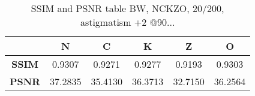 
\begin{table}[h]
	\centering
	\label{table:metrics_astig+2@90_bw}
	\caption[???]{SSIM and PSNR table BW, NCKZO, 20/200, astigmatism +2 @90...}

	\begin{tabular}{cccccc}
	{\bf }                          & {\bf N} & {\bf C} & {\bf K} & {\bf Z} & {\bf O} \\ \hline
	\multicolumn{1}{c|}{{\bf SSIM}} & 0.9307  & 0.9271  & 0.9277  & 0.9193  & 0.9303  		\\
	\multicolumn{1}{c|}{{\bf PSNR}} & 37.2835 & 35.4130 & 36.3713 & 32.7150 & 36.2564
	\end{tabular}
\end{table}